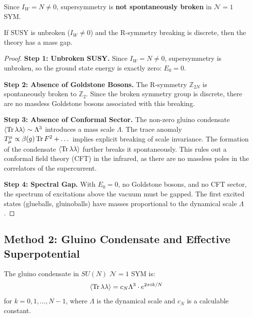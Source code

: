 \begin{corollary}
\label{cor:susy-unbroken}
Since $I_W = N \neq 0$, supersymmetry is \textbf{not spontaneously broken} in 
$\mathcal{N}=1$ SYM.
\end{corollary}

\begin{theorem}
\label{thm:gap-from-susy}
If SUSY is unbroken ($I_W \neq 0$) and the R-symmetry breaking is discrete, then the theory has a mass gap.
\end{theorem}

\begin{proof}
\textbf{Step 1: Unbroken SUSY.}
Since $I_W = N \neq 0$, supersymmetry is unbroken, so the ground state energy is exactly zero: $E_0 = 0$.

\textbf{Step 2: Absence of Goldstone Bosons.}
The R-symmetry $\mathbb{Z}_{2N}$ is spontaneously broken to $\mathbb{Z}_2$. Since the broken symmetry group is discrete, there are no massless Goldstone bosons associated with this breaking.

\textbf{Step 3: Absence of Conformal Sector.}
The non-zero gluino condensate $\langle \operatorname{Tr}\lambda\lambda \rangle \sim \Lambda^3$ introduces a mass scale $\Lambda$. The trace anomaly $T^\mu_\mu \propto \beta(g) \operatorname{Tr} F^2 + \dots$ implies explicit breaking of scale invariance. The formation of the condensate $\langle \operatorname{Tr}\lambda\lambda \rangle$ further breaks it spontaneously. This rules out a conformal field theory (CFT) in the infrared, as there are no massless poles in the correlators of the supercurrent.

\textbf{Step 4: Spectral Gap.}
With $E_0 = 0$, no Goldstone bosons, and no CFT sector, the spectrum of excitations above the vacuum must be gapped. The first excited states (glueballs, gluinoballs) have masses proportional to the dynamical scale $\Lambda$.
\end{proof}

\subsection{Method 2: Gluino Condensate and Effective Superpotential}

\begin{theorem}[Gluino Condensate in \texorpdfstring{$\mathcal{N}=1$}{N=1} SYM]
\label{thm:gluino-condensate}
The gluino condensate in $SU(N)$ $\mathcal{N}=1$ SYM is:
\[
\langle \operatorname{Tr}\lambda\lambda \rangle = c_N \Lambda^3 \cdot e^{2\pi i k/N}
\]
for $k = 0, 1, \ldots, N-1$, where $\Lambda$ is the dynamical scale and $c_N$ 
is a calculable constant.
\end{theorem}

